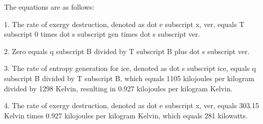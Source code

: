 The equations are as follows:

1. The rate of exergy destruction, denoted as dot e subscript x, ver, equals T subscript 0 times dot s subscript gen times dot s subscript ver.

2. Zero equals q subscript B divided by T subscript B plus dot s subscript ver.

3. The rate of entropy generation for ice, denoted as dot s subscript ice, equals q subscript B divided by T subscript B, which equals 1105 kilojoules per kilogram divided by 1298 Kelvin, resulting in 0.927 kilojoules per kilogram Kelvin.

4. The rate of exergy destruction, denoted as dot e subscript x, ver, equals 303.15 Kelvin times 0.927 kilojoules per kilogram Kelvin, which equals 281 kilowatts.